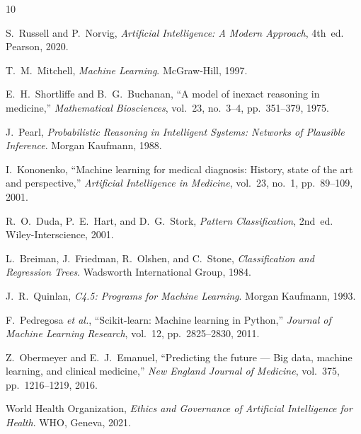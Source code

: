 \documentclass[12pt,a4paper]{article}
\begin{document}
\begin{thebibliography}{10}

S.~Russell and P.~Norvig, \textit{Artificial Intelligence: A Modern Approach}, 4th~ed. Pearson, 2020.

T.~M.~Mitchell, \textit{Machine Learning}. McGraw-Hill, 1997.

E.~H.~Shortliffe and B.~G.~Buchanan, ``A model of inexact reasoning in medicine,'' \textit{Mathematical Biosciences}, vol.~23, no.~3--4, pp.~351--379, 1975.

J.~Pearl, \textit{Probabilistic Reasoning in Intelligent Systems: Networks of Plausible Inference}. Morgan Kaufmann, 1988.

I.~Kononenko, ``Machine learning for medical diagnosis: History, state of the art and perspective,'' \textit{Artificial Intelligence in Medicine}, vol.~23, no.~1, pp.~89--109, 2001.

R.~O.~Duda, P.~E.~Hart, and D.~G.~Stork, \textit{Pattern Classification}, 2nd~ed. Wiley-Interscience, 2001.

L.~Breiman, J.~Friedman, R.~Olshen, and C.~Stone, \textit{Classification and Regression Trees}. Wadsworth International Group, 1984.

J.~R.~Quinlan, \textit{C4.5: Programs for Machine Learning}. Morgan Kaufmann, 1993.

F.~Pedregosa \textit{et al.}, ``Scikit-learn: Machine learning in Python,'' \textit{Journal of Machine Learning Research}, vol.~12, pp.~2825--2830, 2011.

Z.~Obermeyer and E.~J.~Emanuel, ``Predicting the future --- Big data, machine learning, and clinical medicine,'' \textit{New England Journal of Medicine}, vol.~375, pp.~1216--1219, 2016.

World Health Organization, \textit{Ethics and Governance of Artificial Intelligence for Health}. WHO, Geneva, 2021.

\end{thebibliography}
\end{document}
